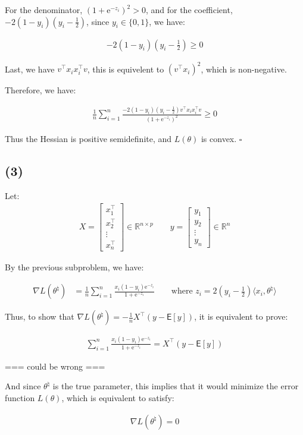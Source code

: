 \documentclass{article}
\begin{document}
For the denominator, $(1 +\mathrm{e}^{-z_i})^2 > 0$, 
and for the coefficient, $-2(1 - y_i)(y_i - \frac{1}{2})$, 
since $y_i \in \{0, 1\}$, we have:

\begin{align*}
    -2(1 - y_i)(y_i - \frac{1}{2}) \ge 0
\end{align*}

Last, we have $v^\intercal  x_i x_i^\intercal  v$, this is equivelent to $(v^\intercal x_i)^2$, which is non-negative.

Therefore, we have:

\begin{align*}
    \frac{1}{n} \sum_{i = 1}^n \frac{-2(1 - y_i)(y_i - \frac{1}{2})v^\intercal  x_i x_i^\intercal  v}{(1 +\mathrm{e}^{-z_i})^2} \ge 0
\end{align*}

Thus the Hessian is positive semidefinite, and $L(\theta)$ is convex. $\square$

\subsection*{(3)}

Let: 
\begin{align*}
    X = \begin{bmatrix}
        x_1^\intercal  \\
        x_2^\intercal  \\
        \vdots \\
        x_n^\intercal 
    \end{bmatrix}
    \in \mathbb{R}^{n \times p}
    \qquad
    y = \begin{bmatrix}
        y_1 \\
        y_2 \\
        \vdots \\
        y_n
    \end{bmatrix}
    \in \mathbb{R}^n
\end{align*}

By the previous subproblem, we have:

\begin{align*}
    \nabla L(\theta^{\natural}) 
    &= \frac{1}{n} \sum_{i = 1}^n \frac{x_i(1 - y_i)\mathrm{e}^{-z_i}}{1 + \mathrm{e}^{-z_i}} 
    \qquad \text{where } z_i = 2(y_i - \frac{1}{2})\langle x_i, \theta^{\natural} \rangle
\end{align*}

Thus, to show that $\nabla L ( \theta^\natural ) = - \frac{1}{n} X^\intercal  (y - \mathsf{E} [ y ] )$,  
it is equivalent to prove:

\begin{align*}
    \sum_{i = 1}^n \frac{x_i(1 - y_i)\mathrm{e}^{-z_i}}{1 + \mathrm{e}^{-z_i}} = X^\intercal  (y - \mathsf{E} [ y ])
\end{align*}


=== could be wrong ===
\bigskip

And since $\theta^{\natural}$ is the true parameter, 
this implies that it would minimize the error function $L(\theta)$, 
which is equivalent to satisfy:

\begin{align*}
    \nabla L(\theta^{\natural}) = 0
\end{align*}
\end{document}
